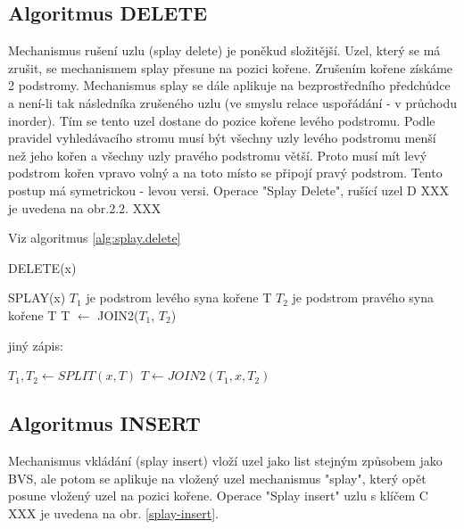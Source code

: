 

\subsection{Algoritmus DELETE}

Mechanismus rušení uzlu (splay delete) je poněkud složitější. Uzel, 
který se má zrušit, se mechanismem splay přesune na pozici kořene. 
Zrušením kořene získáme 2 podstromy. Mechanismus splay se dále aplikuje 
na bezprostředního předchůdce a není-li tak následníka zrušeného uzlu 
(ve smyslu relace uspořádání - v průchodu inorder). Tím se tento uzel 
dostane do pozice kořene levého podstromu. Podle pravidel vyhledávacího 
stromu musí být všechny uzly levého podstromu menší než jeho kořen a 
všechny uzly pravého podstromu větší. Proto musí mít levý podstrom kořen 
vpravo volný a na toto místo se připojí pravý podstrom. Tento postup má 
symetrickou - levou versi. Operace "Splay Delete", rušící uzel D XXX je 
uvedena na obr.2.2. XXX
\par
Viz algoritmus \ref{alg:splay.delete}

\begin{algorithm}[!htb]
\caption{DELETE(x)}
\label{alg:splay.delete}
\begin{algorithmic}
\STATE SPLAY(x)
  \STATE $T_1$ je podstrom levého syna kořene T
       \STATE $T_2$ je podstrom pravého syna kořene T
       \STATE T $\leftarrow$ JOIN2($T_1$, $T_2$)
\ENDIF
\end{algorithmic}
\end{algorithm}

jiný zápis:
\begin{algorithmic}
\STATE $T_1, T_2 \leftarrow SPLIT(x, T)$
\STATE $T \leftarrow JOIN2(T_1, x, T_2)$
\end{algorithmic}

\subsection{Algoritmus INSERT}

Mechanismus vkládání (splay insert) vloží uzel jako list stejným 
způsobem jako BVS, ale potom se aplikuje na vložený uzel mechanismus 
"splay", který opět posune vložený uzel na pozici kořene. Operace
"Splay 
insert" uzlu s klíčem C XXX je uvedena na obr. \ref{splay-insert}.
\par


